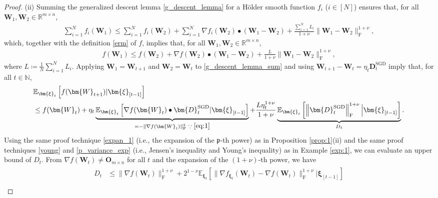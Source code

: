 \documentclass[twoside,11pt]{article}
\begin{document}
\begin{proof}
(ii) Summing the generalized descent lemma \eqref{g_descent_lemma} for a H\"{o}lder smooth function $f_i$ ($i\in [N]$) ensures that, for all $\bm{W}_1, \bm{W}_2 \in \mathbb{R}^{m \times n}$, 
\begin{align*} 
\sum_{i=1}^N f_i(\bm{W}_1) 
\leq 
\sum_{i=1}^N f_i(\bm{W}_2) + \sum_{i=1}^N \nabla f_i (\bm{W}_2) \bullet (\bm{W}_1 - \bm{W}_2)
+ \frac{\sum_{i=1}^N L_i}{1 + \nu}\| \bm{W}_1 - \bm{W}_2 \|_{\mathrm{F}}^{1 + \nu}, 
\end{align*}
which, together with the definition \eqref{erm} of $f$, implies that, for all $\bm{W}_1, \bm{W}_2 \in \mathbb{R}^{m \times n}$, 
\begin{align}\label{g_descent_lemma_sum}
f(\bm{W}_1) 
\leq 
f(\bm{W}_2) + \nabla f (\bm{W}_2) \bullet (\bm{W}_1 - \bm{W}_2)
+ \frac{L}{1 + \nu}\| \bm{W}_1 - \bm{W}_2 \|_{\mathrm{F}}^{1 + \nu}, 
\end{align}
where $L \coloneqq \frac{1}{N} \sum_{i=1}^N L_i$. Applying $\bm{W}_1 = \bm{W}_{t+1}$ and $\bm{W}_2 = \bm{W}_t$ to \eqref{g_descent_lemma_sum} and using $\bm{W}_{t+1} - \bm{W}_t = \eta_t \bm{D}_t^{\mathrm{SGD}}$ imply that, for all $t \in \mathbb{N}$,
\begin{align*}
&\mathbb{E}_{\bm{\xi}_t} \left[ f(\bm{W}_{t+1})|\bm{\xi}_{[t-1]} \right]\\
&\leq 
f(\bm{W}_t) 
+ \eta_t 
\underbrace{\mathbb{E}_{\bm{\xi}_t} \left[ \nabla f (\bm{W}_t) \bullet \bm{D}_t^{\mathrm{SGD}} |\bm{\xi}_{[t-1]} \right]}_{= - \|\nabla f (\bm{W}_t)\|_{\mathrm{F}}^2 \text{ } \because \text{ } \eqref{eq:1}}
+ \frac{L \eta_t^{1 + \nu}}{1 + \nu} 
\underbrace{\mathbb{E}_{\bm{\xi}_t} \left[
\left\| \bm{D}_t^{\mathrm{SGD}} \right\|_{\mathrm{F}}^{1 + \nu} \Big| \bm{\xi}_{[t-1]} \right]}_{D_t}.
\end{align*}
Using the same proof technique \eqref{expan_1} (i.e., the expansion of the $\mathfrak{p}$-th power) as in Proposition \ref{prop:1}(ii) and the same proof techniques \eqref{young} and \eqref{p_variance_exp} (i.e., Jensen's inequality and Young's inequality) as in Example \ref{exp:1}, we can evaluate an upper bound of $D_t$. From $\nabla f (\bm{W}_t) \neq \bm{O}_{m \times n}$ for all $t$ and the expansion of the $(1 + \nu)$-th power, we have 
\begin{align}\label{comp_d_t}
\begin{split}
D_t
&\leq
\|\nabla f (\bm{W}_t) \|_{\mathrm{F}}^{1 + \nu}
+
2^{1 - \nu} \mathbb{E}_{\bm{\xi}_t} \left[\|\nabla f_{\bm{\xi}_t} (\bm{W}_t) - \nabla f (\bm{W}_t) \|_{\mathrm{F}}^{1 + \nu} |\bm{\xi}_{[t-1]} \right]\\

\end{split}
\end{align}
\end{proof}
\end{document}
